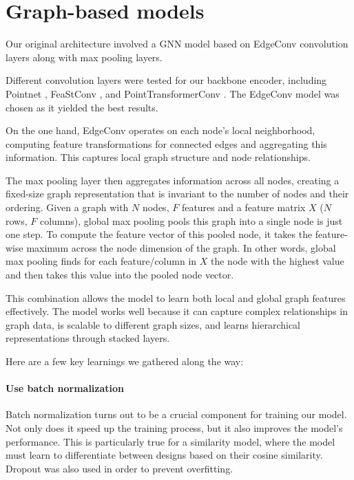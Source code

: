 \section{Graph-based models}

Our original architecture involved a GNN model based on EdgeConv \cite{wangDynamicGraphCNN2019} convolution layers along with max pooling layers. 

Different convolution layers were tested for our backbone encoder, including Pointnet \cite{qiPointNetDeepHierarchical2017}, FeaStConv \cite{vermaFeaStNetFeatureSteeredGraph2018}, and PointTransformerConv \cite{zhaoPointTransformer2021}. The EdgeConv model was chosen as it yielded the best results.


On the one hand, EdgeConv operates on each node's local neighborhood, computing feature transformations for connected edges and aggregating this information. This captures local graph structure and node relationships. 

The max pooling layer then aggregates information across all nodes, creating a fixed-size graph representation that is invariant to the number of nodes and their ordering.
Given a graph with $N$ nodes, $F$ features and a feature matrix $X$ ($N$ rows, $F$ columns), global max pooling pools this graph into a single node is just one step. To compute the feature vector of this pooled node, it takes the feature-wise maximum across the node dimension of the graph. In other words, global max pooling finds for each feature/column in $X$ the node with the highest value and then takes this value into the pooled node vector. 

This combination allows the model to learn both local and global graph features effectively. The model works well because it can capture complex relationships in graph data, is scalable to different graph sizes, and learns hierarchical representations through stacked layers.

Here are a few key learnings we gathered along the way:

\paragraph{Use batch normalization}

Batch normalization \cite{ioffeBatchNormalizationAccelerating2015} turns out to be a crucial component for training our model. Not only does it speed up the training process, but it also improves the model's performance. This is particularly true for a similarity model, where the model must learn to differentiate between designs based on their cosine similarity. Dropout was also used in order to prevent overfitting.

